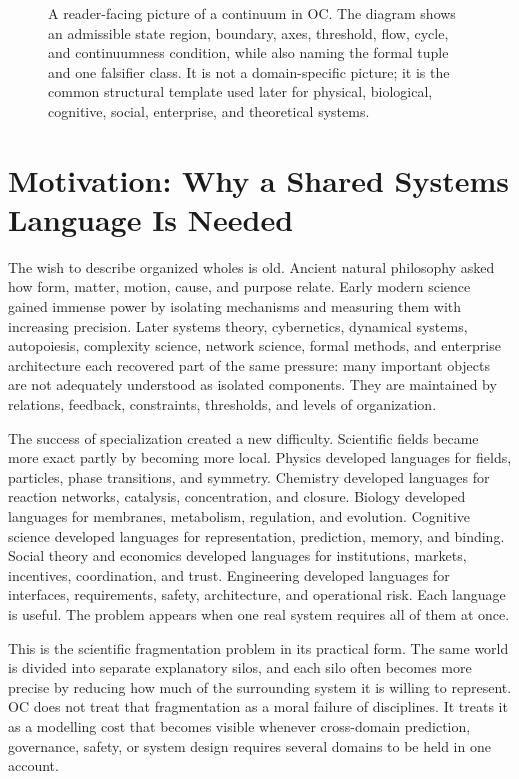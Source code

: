 \begin{figure}[p]
{}
\caption{A reader-facing picture of a continuum in OC. The diagram shows an
admissible state region, boundary, axes, threshold, flow, cycle, and
continuumness condition, while also naming the formal tuple and one falsifier
class. It is not a domain-specific picture; it is the common structural
template used later for physical, biological, cognitive, social, enterprise,
and theoretical systems.}
\label{fig:r007-continuum-demonstrator}
\end{figure}

\section{Motivation: Why a Shared Systems Language Is Needed}
\label{sec:r007-motivation}

The wish to describe organized wholes is old. Ancient natural philosophy asked
how form, matter, motion, cause, and purpose relate. Early modern science gained
immense power by isolating mechanisms and measuring them with increasing
precision. Later systems theory, cybernetics, dynamical systems, autopoiesis,
complexity science, network science, formal methods, and enterprise architecture
each recovered part of the same pressure: many important objects are not
adequately understood as isolated components. They are maintained by relations,
feedback, constraints, thresholds, and levels of organization.

The success of specialization created a new difficulty. Scientific fields
became more exact partly by becoming more local. Physics developed languages for
fields, particles, phase transitions, and symmetry. Chemistry developed
languages for reaction networks, catalysis, concentration, and closure. Biology
developed languages for membranes, metabolism, regulation, and evolution.
Cognitive science developed languages for representation, prediction, memory,
and binding. Social theory and economics developed languages for institutions,
markets, incentives, coordination, and trust. Engineering developed languages
for interfaces, requirements, safety, architecture, and operational risk. Each
language is useful. The problem appears when one real system requires all of
them at once.

This is the scientific fragmentation problem in its practical form. The same
world is divided into separate explanatory silos, and each silo often becomes
more precise by reducing how much of the surrounding system it is willing to
represent. OC does not treat that fragmentation as a moral failure of
disciplines. It treats it as a modelling cost that becomes visible whenever
cross-domain prediction, governance, safety, or system design requires several
domains to be held in one account.

